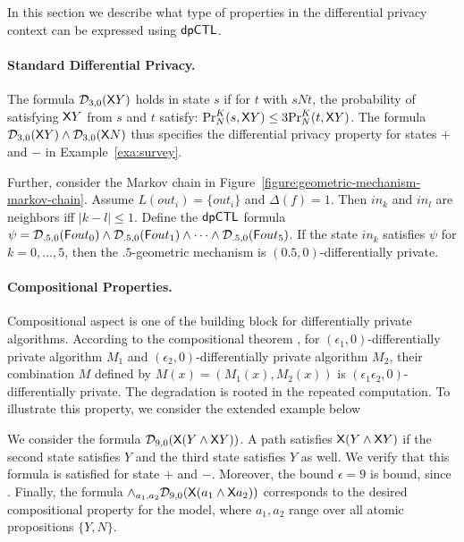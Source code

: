 In this section we describe what type of properties in the differential privacy context can be expressed using $\dpCTL$.

\paragraph{Standard Differential Privacy.}
The formula $\dpriv{3}{0} (\X Y)$ holds in state $s$ if for  $t$ with $sNt$, the probability of satisfying $\X Y$ from $s$ and $t$ satisfy:
$\myPr{s}{K}{N}{\X Y}\le 3\myPr{t}{K}{N}{\X Y}$. The formula $\dpriv{3}{0} (\X Y)\wedge \dpriv{3}{0} (\X N)$ thus specifies the differential privacy property for states $+$ and $-$ in Example~\ref{exa:survey}.

Further, consider the Markov chain in
Figure~\ref{figure:geometric-mechanism-markov-chain}. Assume
$L(out_i) = \{ out_i \}$ and $\Delta (f) = 1$. Then $in_k$ and $in_l$ are
neighbors iff $| k - l | \leq 1$. Define the $\dpCTL$ formula
$\psi = \dpriv{.5}{0} (\F out_0) \wedge \dpriv{.5}{0} (\F out_1) \wedge
\cdots \wedge \dpriv{.5}{0} (\F out_5)$. If the state $in_k$ satisfies
$\psi$ for $k = 0, \ldots, 5$, then the $.5$-geometric mechanism is
$(0.5, 0)$-differentially private.


\paragraph{Compositional Properties.}
Compositional aspect is one of the building block for differentially private algorithms. According to the compositional theorem \cite{}, for $(\epsilon_1,0)$-differentially private algorithm $M_1$ and
$(\epsilon_2,0)$-differentially private algorithm $M_2$, their combination $M$ defined by $M(x)=(M_1(x), M_2(x))$ is $(\epsilon_1\epsilon_2,0)$-differentially private. The degradation is rooted in the repeated computation. To illustrate this property, we consider the extended example below 

We consider the formula $\dpriv{9}{0} (\X (Y\wedge \X Y))$. A path satisfies $\X (Y\wedge \X Y)$ if the second state satisfies $Y$ and the third state satisfies $Y$ as well. We verify that this formula is satisfied  for state $+$ and $-$. Moreover, the bound $\epsilon=9$ is bound, since . Finally, the formula $\wedge_{a_1,a_2}\dpriv{9}{0} (\X (a_1\wedge \X a_2))$ corresponds to the desired compositional property for the model, where $a_1,a_2$ range over all atomic propositions $\{Y,N\}$.


